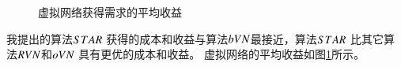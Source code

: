 \begin{figure}[htbp]
\begin{minipage}{0.4\textwidth}
\caption{虚拟网络获得需求的平均收益}\label{fig:RevenueAccumulateAverageVirtualNetwork}
\end{minipage}\vspace{\baselineskip}
\end{figure}
我提出的算法$STAR$ 获得的成本和收益与算法$bVN$最接近，算法$STAR$ 比其它算法$RVN$和$oVN$ 具有更优的成本和收益。
虚拟网络的平均收益如图\ref{fig:RevenueAccumulateAverageVirtualNetwork}所示。



